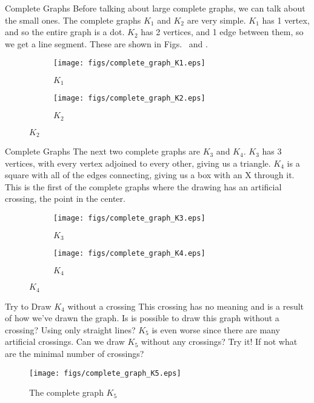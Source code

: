 \documentclass{beamer}
\begin{document}
    \begin{frame}{Complete Graphs}
        Before talking about large complete graphs, we can talk about the small ones.
        The complete graphs $K_{1}$ and $K_{2}$ are very simple. $K_{1}$ has 1 vertex, and so
        the entire graph is a dot. $K_{2}$ has 2 vertices, and 1 edge between them, so we get
        a line segment. These are shown in Figs.~ and .
        \begin{figure}
            \centering
            \begin{subfigure}[c]{0.49\textwidth}
                \centering
                \texttt{[image: figs/complete\_graph\_K1.eps]}
                \caption{$K_{1}$}
                \label{fig:K_1}
            \end{subfigure}
            \begin{subfigure}[c]{0.49\textwidth}
                \centering
                \texttt{[image: figs/complete\_graph\_K2.eps]}
                \caption{$K_{2}$}
                \label{fig:K_2}
            \end{subfigure}
            \label{fig:complete_graphs_003}
        \end{figure}
    \end{frame}
    \begin{frame}{Complete Graphs}
        The next two complete graphs are $K_{3}$ and $K_{4}$. $K_{3}$ has 3 vertices, with
        every vertex adjoined to every other, giving us a triangle. $K_{4}$ is a square with all
        of the edges connecting, giving us a box with an X through it. This is the first of the
        complete graphs where the drawing has an artificial crossing, the point in the center.
        \begin{figure}
            \centering
            \begin{subfigure}[c]{0.49\textwidth}
                \centering
                \texttt{[image: figs/complete\_graph\_K3.eps]}
                \caption{$K_{3}$}
                \label{fig:K_3}
            \end{subfigure}
            \begin{subfigure}[c]{0.49\textwidth}
                \centering
                \texttt{[image: figs/complete\_graph\_K4.eps]}
                \caption{$K_{4}$}
                \label{fig:K_4}
            \end{subfigure}
        \end{figure}
    \end{frame}
    \begin{frame}{Try to Draw $K_{4}$ without a crossing}
        This crossing has no meaning and is a result of how we've drawn the graph.
        Is is possible to draw this graph without a crossing? Using only straight lines?
        $K_{5}$ is even worse since there are many artificial crossings. Can we draw $K_{5}$
        without any crossings? Try it! If not what are the minimal number of crossings?
        \begin{figure}
            \centering
            \texttt{[image: figs/complete\_graph\_K5.eps]}
            \caption{The complete graph $K_{5}$}
            \label{fig:K_5}
        \end{figure}
    \end{frame}
\end{document}
